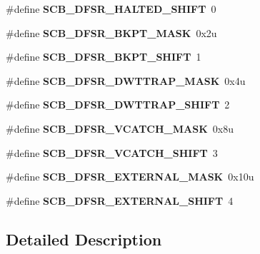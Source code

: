 \begin{DoxyCompactItemize}
\item 
\hypertarget{group___s_c_b___register___masks_ga5715d28eed87f24337cf4391a1d65e41}{}\#define {\bfseries S\+C\+B\+\_\+\+D\+F\+S\+R\+\_\+\+H\+A\+L\+T\+E\+D\+\_\+\+S\+H\+I\+F\+T}~0\label{group___s_c_b___register___masks_ga5715d28eed87f24337cf4391a1d65e41}

\item 
\hypertarget{group___s_c_b___register___masks_gaa21a685119e3829d559a25c8adf5cccb}{}\#define {\bfseries S\+C\+B\+\_\+\+D\+F\+S\+R\+\_\+\+B\+K\+P\+T\+\_\+\+M\+A\+S\+K}~0x2u\label{group___s_c_b___register___masks_gaa21a685119e3829d559a25c8adf5cccb}

\item 
\hypertarget{group___s_c_b___register___masks_gab2da04235aa0df8d6d867336d1b2c9c5}{}\#define {\bfseries S\+C\+B\+\_\+\+D\+F\+S\+R\+\_\+\+B\+K\+P\+T\+\_\+\+S\+H\+I\+F\+T}~1\label{group___s_c_b___register___masks_gab2da04235aa0df8d6d867336d1b2c9c5}

\item 
\hypertarget{group___s_c_b___register___masks_gaa6d8e1428ddb9a650f965c33e09bad7a}{}\#define {\bfseries S\+C\+B\+\_\+\+D\+F\+S\+R\+\_\+\+D\+W\+T\+T\+R\+A\+P\+\_\+\+M\+A\+S\+K}~0x4u\label{group___s_c_b___register___masks_gaa6d8e1428ddb9a650f965c33e09bad7a}

\item 
\hypertarget{group___s_c_b___register___masks_ga6a1d724f4fe22533bd37c3f5179d2219}{}\#define {\bfseries S\+C\+B\+\_\+\+D\+F\+S\+R\+\_\+\+D\+W\+T\+T\+R\+A\+P\+\_\+\+S\+H\+I\+F\+T}~2\label{group___s_c_b___register___masks_ga6a1d724f4fe22533bd37c3f5179d2219}

\item 
\hypertarget{group___s_c_b___register___masks_ga44491a07e0ef59bfe8f7797f03acfabd}{}\#define {\bfseries S\+C\+B\+\_\+\+D\+F\+S\+R\+\_\+\+V\+C\+A\+T\+C\+H\+\_\+\+M\+A\+S\+K}~0x8u\label{group___s_c_b___register___masks_ga44491a07e0ef59bfe8f7797f03acfabd}

\item 
\hypertarget{group___s_c_b___register___masks_gaa503bd566d848235828e742233b8ff20}{}\#define {\bfseries S\+C\+B\+\_\+\+D\+F\+S\+R\+\_\+\+V\+C\+A\+T\+C\+H\+\_\+\+S\+H\+I\+F\+T}~3\label{group___s_c_b___register___masks_gaa503bd566d848235828e742233b8ff20}

\item 
\hypertarget{group___s_c_b___register___masks_ga938e2bfb90d14dba16b2dd249b6cdbdd}{}\#define {\bfseries S\+C\+B\+\_\+\+D\+F\+S\+R\+\_\+\+E\+X\+T\+E\+R\+N\+A\+L\+\_\+\+M\+A\+S\+K}~0x10u\label{group___s_c_b___register___masks_ga938e2bfb90d14dba16b2dd249b6cdbdd}

\item 
\hypertarget{group___s_c_b___register___masks_ga0c4c283537c78ec5650fd7eaaf8c9cd7}{}\#define {\bfseries S\+C\+B\+\_\+\+D\+F\+S\+R\+\_\+\+E\+X\+T\+E\+R\+N\+A\+L\+\_\+\+S\+H\+I\+F\+T}~4\label{group___s_c_b___register___masks_ga0c4c283537c78ec5650fd7eaaf8c9cd7}

\end{DoxyCompactItemize}


\subsection{Detailed Description}
